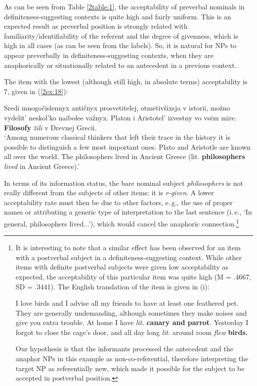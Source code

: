\documentclass[output=paper]{langsci/langscibook}
\begin{document}
As can be seen from Table \ref{2table:1}, the acceptability of preverbal nominals in definiteness-suggesting contexts is quite high and fairly uniform. This is an expected result as preverbal position is strongly related with familiarity/identifiability of the referent and the degree of givenness, which is high in all cases (as can be seen from the labels). So, it is natural for NPs to appear preverbally in definiteness-suggesting contexts, when they are anaphorically or situationally related to an antecedent in a previous context.

The item with the lowest (although still high, in absolute terms) acceptability is 7, given in (\ref{2ex:18}):

\begin{samepage}
\begin{exe}
\ex\label{2ex:18}
Sredi mnogo\v{c}islennyx anti\v{c}nyx prosvetitelej, otmetiv\v{s}ixsja v istorii, mo\v{z}no vydelit' neskol'ko naibolee va\v{z}nyx. 
Platon i Aristotel' izvestny vo vs\"em mire. {\bf{Filosofy}} {\emph{\v{z}ili}} v Drevnej Grecii. \\
`Among numerous classical thinkers that left their trace in the history it is possible to distinguish a few most important ones. Plato and Aristotle are known all over the world. The philosophers lived in Ancient Greece (lit. {\bf{philosophers}} {\emph{lived}} in Ancient Greece).'
\end{exe}
\end{samepage}

In terms of its information status, the bare nominal subject {\emph{philosophers}} is not really different from the subjects of other items: it is {\emph{r-given}}. A lower acceptability rate must then be due to other factors, e.\,g., the use of proper names or attributing a generic type of interpretation to the last sentence (i.\,e., `In general, philosophers lived...'), which would cancel the anaphoric connection.\footnote{It is interesting to note that a similar effect has been observed for an item with a postverbal subject in a definiteness-suggesting context. While other items with definite postverbal subjects were given low acceptability as expected, the acceptability of this particular item was quite high (M = .4667, SD = .3441). The English translation of the item is given in (i):
\vspace*{-1mm}
\begin{exe}
I love birds and I advise all my friends to have at least one feathered pet. They are generally undemanding, although sometimes they make noises and give you extra trouble. At home I have {\emph{lit.}} {\bf{canary and parrot}}. Yesterday I forgot to close the cage's door, and all day long {\emph{lit.}} around room {\emph{flew}} {\bf{birds.}}
\end{exe}
\vspace*{-1mm}
\noindent
Our hypothesis is that the informants processed the antecedent and the anaphor NPs in this example as non-co-referential, therefore interpreting the target NP as referentially new, which made it possible for the subject to be accepted in postverbal position.
}
\end{document}
